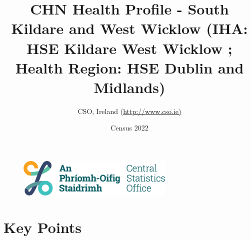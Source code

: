 \documentclass{article}
\title{CHN Health Profile - South Kildare and West Wicklow (IHA: HSE Kildare West Wicklow ;  Health Region: HSE Dublin and Midlands) }
\date{Census 2022}
\author{CSO, Ireland  (\url{http://www.cso.ie)}}
\begin{document}


\begin{figure}
	\centering
\includegraphics[width =75mm]{../figures/CSO_Logo.png}
\end{figure}

				 
		   
						  
														  
																																													
												 
			 
\maketitle
					
													   
				 
						 
																																																																											   
				 
				  
  \pagebreak
    	    \tableofcontents

\pagebreak


\section{Key Points}
\end{document}
